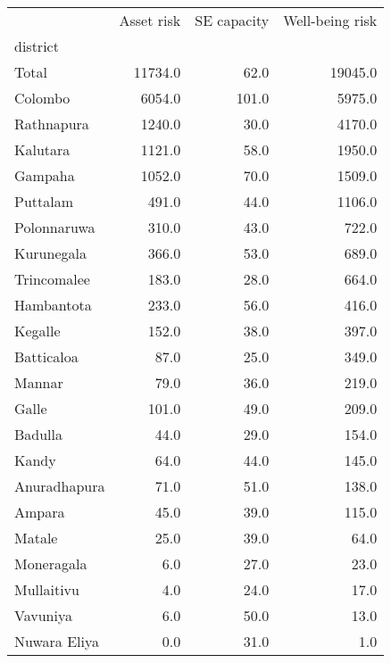\begin{tabular}{lrrr}
\toprule
{} &  Asset risk &  SE capacity &  Well-being risk \\
district     &             &              &                  \\
\midrule
Total        &     11734.0 &         62.0 &          19045.0 \\
Colombo      &      6054.0 &        101.0 &           5975.0 \\
Rathnapura   &      1240.0 &         30.0 &           4170.0 \\
Kalutara     &      1121.0 &         58.0 &           1950.0 \\
Gampaha      &      1052.0 &         70.0 &           1509.0 \\
Puttalam     &       491.0 &         44.0 &           1106.0 \\
Polonnaruwa  &       310.0 &         43.0 &            722.0 \\
Kurunegala   &       366.0 &         53.0 &            689.0 \\
Trincomalee  &       183.0 &         28.0 &            664.0 \\
Hambantota   &       233.0 &         56.0 &            416.0 \\
Kegalle      &       152.0 &         38.0 &            397.0 \\
Batticaloa   &        87.0 &         25.0 &            349.0 \\
Mannar       &        79.0 &         36.0 &            219.0 \\
Galle        &       101.0 &         49.0 &            209.0 \\
Badulla      &        44.0 &         29.0 &            154.0 \\
Kandy        &        64.0 &         44.0 &            145.0 \\
Anuradhapura &        71.0 &         51.0 &            138.0 \\
Ampara       &        45.0 &         39.0 &            115.0 \\
Matale       &        25.0 &         39.0 &             64.0 \\
Moneragala   &         6.0 &         27.0 &             23.0 \\
Mullaitivu   &         4.0 &         24.0 &             17.0 \\
Vavuniya     &         6.0 &         50.0 &             13.0 \\
Nuwara Eliya &         0.0 &         31.0 &              1.0 \\
\bottomrule
\end{tabular}
